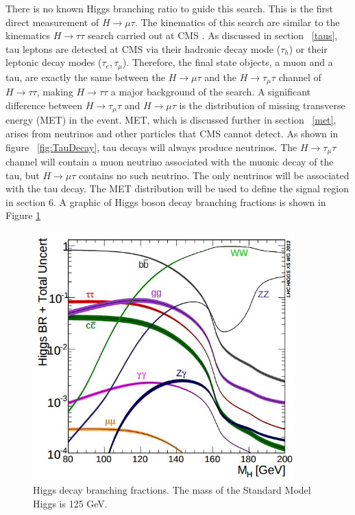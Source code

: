 \documentclass[oneside, letterpaper, oldfontcommands]{memoir}
\begin{document}
\qquad There is no known Higgs branching ratio to guide this search. This is the first direct measurement of $H \rightarrow \mu \tau$. The kinematics of this search are similar to the kinematics $H \rightarrow \tau\tau$ search carried out at CMS \cite{Chatrchyan:2012xdj}. As discussed in section ~\ref{taus}, tau leptons are detected at CMS via their hadronic decay mode ($\tau_{h}$) or their leptonic decay modes ($\tau_{e}, \tau_{\mu}$). Therefore, the final state objects, a muon and a tau, are exactly the same between the $H \rightarrow \mu \tau$ and the $H \rightarrow \tau_{\mu} \tau$ channel of $H \rightarrow \tau\tau$, making $H \rightarrow \tau\tau$ a major background of the search. A significant difference between $H \rightarrow \tau_{\mu} \tau$ and $H \rightarrow \mu \tau$ is the distribution of missing transverse energy (MET) in the event. MET, which is discussed further in section ~\ref{met}, arises from neutrinos and other particles that CMS cannot detect. As shown in figure ~\ref{fig:TauDecay}, tau decays will always produce neutrinos. The $H \rightarrow \tau_{\mu} \tau$ channel will contain a muon neutrino associated with the muonic decay of the tau, but $H \rightarrow \mu \tau$ contains no such neutrino. The only neutrinos will be associated with the tau decay. The MET distribution will be used to define the signal region in section 6. A graphic of Higgs boson decay branching fractions is shown in Figure \ref{fig:higgsBR}\cite{Heinemeyer:2013tqa}

\begin{figure}[here]
\includegraphics[width=0.9\textwidth]{higgsBR.jpg}
\caption{Higgs decay branching fractions\cite{Heinemeyer:2013tqa}. The mass of the Standard Model Higgs is 125 GeV. }
\label{fig:higgsBR}
\end{figure}
\end{document}
